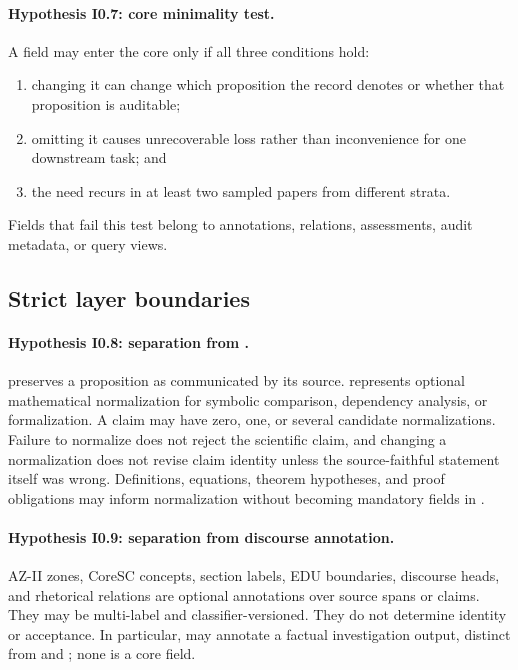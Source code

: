 \paragraph{Hypothesis I0.7: core minimality test.}
A field may enter the core only if all three conditions hold:
\begin{enumerate}[label=\textup{(\roman*)}]
  \item changing it can change which proposition the record denotes or whether that proposition is auditable;
  \item omitting it causes unrecoverable loss rather than inconvenience for one downstream task; and
  \item the need recurs in at least two sampled papers from different strata.
\end{enumerate}
Fields that fail this test belong to annotations, relations, assessments, audit metadata, or query views.

\subsection{Strict layer boundaries}

\paragraph{Hypothesis I0.8: separation from \MathClaimIR{}.}
\ScientificClaim{} preserves a proposition as communicated by its source. \MathClaimIR{} represents optional mathematical normalization for symbolic comparison, dependency analysis, or formalization. A claim may have zero, one, or several candidate normalizations. Failure to normalize does not reject the scientific claim, and changing a normalization does not revise claim identity unless the source-faithful statement itself was wrong. Definitions, equations, theorem hypotheses, and proof obligations may inform normalization without becoming mandatory fields in \ScientificClaim{}.

\paragraph{Hypothesis I0.9: separation from discourse annotation.}
AZ-II zones, CoreSC concepts, section labels, EDU boundaries, discourse heads, and rhetorical relations are optional annotations over source spans or claims. They may be multi-label and classifier-versioned. They do not determine identity or acceptance. In particular,  may annotate a factual investigation output, distinct from  and ; none is a core field.

